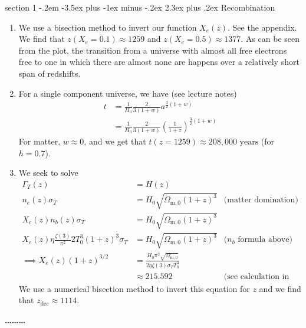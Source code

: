 \documentclass[12pt]{article}
\makeatletter
\newenvironment{problem}{\@startsection
	{section}
	{1}
	{-.2em}
	{-3.5ex plus -1ex minus -.2ex}
	{2.3ex plus .2ex}
	{\pagebreak[3]%
		\large\bf\noindent{Problem }
	}
}
{%
	\begin{center}\large\bf \ldots\ldots\ldots\end{center}}
\newcommand{\Omx}[1]{\ensuremath{\Omega_\mathrm{#1} } }
\makeatother
\begin{document}
\begin{problem}{Recombination}
\begin{enumerate}
			\begin{figure}
				\centering
			\end{figure}
			
			\item We use a bisection method to invert our function $X_e(z)$.  See the appendix.  We find that $\boxed{z(X_e = 0.1) \approx 1259}$ and $\boxed{z(X_e = 0.5) \approx 1377}$.  As can be seen from the plot, the transition from a universe with almost all free electrons free to one in which there are almost none are happens over a relatively short span of redshifts.
			
			\item For a single component universe, we have (see lecture notes) \begin{align*}
				t &= \frac{1}{H_0}\frac{2}{3(1  + w)}a^{\frac{3}{2}(1+w)}
				\\
				&= \frac{1}{H_0}\frac{2}{3(1  + w)}\left(\frac{1}{1+z}\right)^{\frac{3}{2}(1+w)}
			\end{align*} For matter, $w\approx 0$, and we get that $\boxed{t(z=1259)\approx 208,000 \text{ years}}$ (for $h=0.7$).
			
			\item We seek to solve \begin{align*}
				\Gamma_T(z) &= H(z)
				\\
				n_e(z)\sigma_T &= H_0 \sqrt{\Omx{m,0}( 1 + z )^3} & \text{(matter domination)}
				\\
				X_e(z)n_b(z)\sigma_T &= H_0 \sqrt{\Omx{m,0}( 1 + z )^3}
				\\
				X_e(z) \eta \frac{\zeta(3)}{\pi^2}2 T_0^3 (1+z)^3\sigma_T &= H_0 \sqrt{\Omx{m,0}( 1 + z )^3} & \text{($n_b$ formula above)}
				\\
				\implies X_e(z) (1+z)^{3/2} &= \frac{H_0\pi^2\sqrt{\Omx{m,0}}}{2\eta\zeta(3)\sigma_TT_0^3}
				\\
				&\approx 215.592 & \text{(see calculation in appendix)}
			\end{align*} We use a numerical bisection method to invert this equation for $z$ and we find that $\boxed{z_\mathrm{dec} \approx 1114}$.\\
			

\end{enumerate}
\end{problem}
\end{document}
